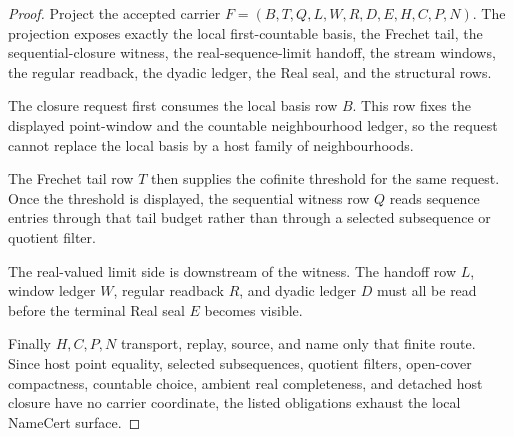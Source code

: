 \begin{proof}
Project the accepted carrier $F=(B,T,Q,L,W,R,D,E,H,C,P,N)$. The projection exposes exactly the local first-countable basis, the Frechet tail, the sequential-closure witness, the real-sequence-limit handoff, the stream windows, the regular readback, the dyadic ledger, the Real seal, and the structural rows.

The closure request first consumes the local basis row $B$. This row fixes the displayed point-window and the countable neighbourhood ledger, so the request cannot replace the local basis by a host family of neighbourhoods.

The Frechet tail row $T$ then supplies the cofinite threshold for the same request. Once the threshold is displayed, the sequential witness row $Q$ reads sequence entries through that tail budget rather than through a selected subsequence or quotient filter.

The real-valued limit side is downstream of the witness. The handoff row $L$, window ledger $W$, regular readback $R$, and dyadic ledger $D$ must all be read before the terminal Real seal $E$ becomes visible.

Finally $H,C,P,N$ transport, replay, source, and name only that finite route. Since host point equality, selected subsequences, quotient filters, open-cover compactness, countable choice, ambient real completeness, and detached host closure have no carrier coordinate, the listed obligations exhaust the local NameCert surface.
\end{proof}

